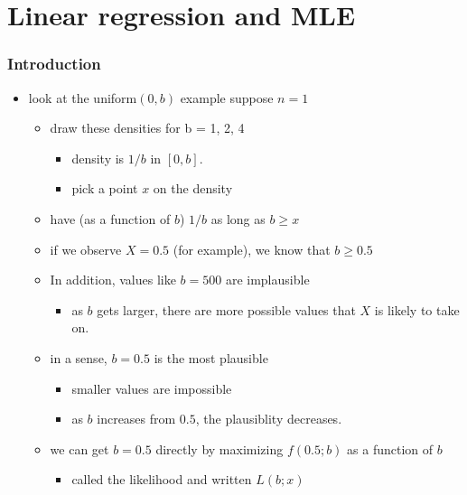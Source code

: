 
\part*{Linear regression and MLE}%

\section{Introduction}

\begin{itemize}
\item look at the uniform$(0,b)$ example suppose $n = 1$
\begin{itemize}
\item draw these densities for b = 1, 2, 4
\begin{itemize}
\item density is $1/b$ in $[0,b]$.
\item pick a point $x$ on the density
\end{itemize}
\item have (as a function of $b$) $1/b$ as long as $b \geq x$
\item if we observe $X = 0.5$ (for example), we know that $b \geq 0.5$
\item In addition, values like $b = 500$ are implausible
\begin{itemize}
\item as $b$ gets larger, there are more possible values that $X$ is
         likely to take on.
\end{itemize}
\item in a sense, $b = 0.5$ is the most plausible
\begin{itemize}
\item smaller values are impossible
\item as $b$ increases from $0.5$, the plausiblity decreases.
\end{itemize}
\item we can get $b = 0.5$ directly by maximizing $f(0.5; b)$ as a
       function of $b$
\begin{itemize}
\item called the likelihood and written $L(b; x)$
\end{itemize}
\end{itemize}
\end{itemize}

